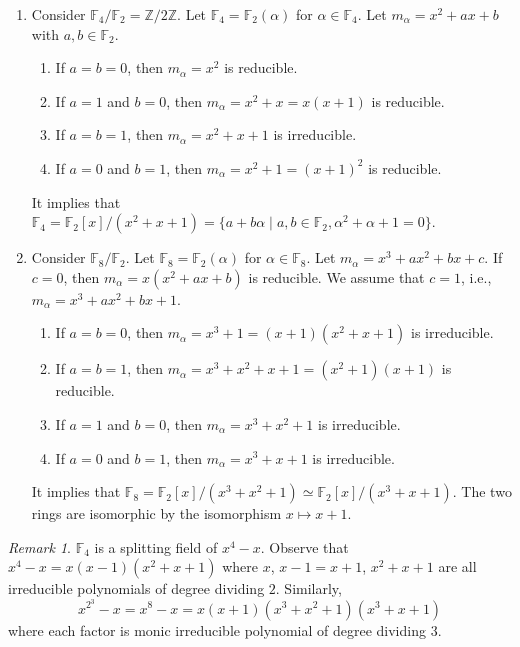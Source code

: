 \documentclass[twoside]{article}
\newcommand\Z{\mathbb Z}
\newcommand\F{\mathbb F}
\theoremstyle{remark}
\newtheorem*{remark}{{Remark}}
\newcounter{theorem}
\begin{document}
\begin{examples}
  \begin{enumerate}[label=\arabic*.]
    \item Consider \(\F_4 / \F_2 = \Z/2\Z\). Let \(\F_4 = \F_2(\alpha)\) for \(\alpha \in \F_4\). Let \(m_\alpha = x^2 + ax + b\) with \(a,b \in \F_2\).
    \begin{enumerate}[label=(\roman*), nosep]
      \item If \(a=b=0\), then \(m_\alpha = x^2\) is reducible.
      \item If \(a=1\) and \(b=0\), then \(m_\alpha = x^2 + x = x (x+1)\) is reducible.
      \item If \(a=b=1\), then \(m_\alpha = x^2 + x + 1\) is irreducible.
      \item If \(a=0\) and \(b=1\), then \(m_\alpha = x^2+1 = (x+1)^2\) is reducible.
    \end{enumerate}
    It implies that \(\F_4 = \F_2[x]/(x^2+x+1) = \{a + b\alpha \mid a,b \in \F_2, \alpha^2 + \alpha + 1 = 0\}\).
    
    \item Consider \(\F_8/\F_2\). Let \(\F_8 = \F_2(\alpha)\) for \(\alpha \in \F_8\). Let \(m_\alpha = x^3 + ax^2 + bx + c\). If \(c=0\), then \(m_\alpha = x (x^2 + ax + b)\) is reducible. We assume that \(c=1\), i.e., \(m_\alpha = x^3 + ax^2 + bx + 1\).
    \begin{enumerate}[label=(\roman*), nosep]
      \item If \(a=b=0\), then \(m_\alpha = x^3+1 = (x+1) (x^2+x+1)\) is irreducible.
      \item If \(a=b=1\), then \(m_\alpha = x^3 + x^2 + x + 1 = (x^2+1) (x+1)\) is reducible.
      \item If \(a=1\) and \(b=0\), then \(m_\alpha = x^3 + x^2 + 1\) is irreducible.
      \item If \(a=0\) and \(b=1\), then \(m_\alpha = x^3 + x + 1\) is irreducible.
    \end{enumerate}
    It implies that \(\F_8 = \F_2[x]/(x^3+x^2+1) \simeq \F_2[x]/(x^3+x+1)\). The two rings are isomorphic by the isomorphism \(x \mapsto x+1\).
  \end{enumerate}
  
  \begin{remark}
    \(\F_4\) is a splitting field of \(x^4-x\). Observe that \(x^4-x = x (x-1) (x^2+x+1)\) where \(x\), \(x-1 = x+1\), \(x^2+x+1\) are all irreducible polynomials of degree dividing \(2\). Similarly,
    \[ x^{2^3}-x = x^8-x = x (x+1) (x^3+x^2+1) (x^3+x+1) \]
    where each factor is monic irreducible polynomial of degree dividing \(3\).
  \end{remark}
  

\end{examples}
\end{document}
